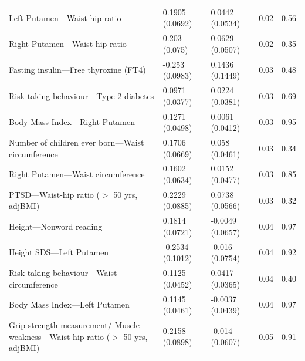\begin{table}[ht]
\begin{tabular}{lllrr}
  Left Putamen---Waist-hip ratio & 0.1905 (0.0692) & 0.0442 (0.0534) & 0.02 & 0.56 \\ 
  Right Putamen---Waist-hip ratio & 0.203 (0.075) & 0.0629 (0.0507) & 0.02 & 0.35 \\ 
  Fasting insulin---Free thyroxine (FT4) & -0.253 (0.0983) & 0.1436 (0.1449) & 0.03 & 0.48 \\ 
  Risk-taking behaviour---Type 2 diabetes & 0.0971 (0.0377) & 0.0224 (0.0381) & 0.03 & 0.69 \\ 
  Body Mass Index---Right Putamen & 0.1271 (0.0498) & 0.0061 (0.0412) & 0.03 & 0.95 \\ 
  Number of children ever born---Waist circumference & 0.1706 (0.0669) & 0.058 (0.0461) & 0.03 & 0.34 \\ 
  Right Putamen---Waist circumference & 0.1602 (0.0634) & 0.0152 (0.0477) & 0.03 & 0.85 \\ 
  PTSD---Waist-hip ratio ($>$ 50 yrs, adjBMI) & 0.2229 (0.0885) & 0.0738 (0.0566) & 0.03 & 0.32 \\ 
  Height---Nonword reading & 0.1814 (0.0721) & -0.0049 (0.0657) & 0.04 & 0.97 \\ 
  Height SDS---Left Putamen & -0.2534 (0.1012) & -0.016 (0.0754) & 0.04 & 0.92 \\ 
  Risk-taking behaviour---Waist circumference & 0.1125 (0.0452) & 0.0417 (0.0365) & 0.04 & 0.40 \\ 
  Body Mass Index---Left Putamen & 0.1145 (0.0461) & -0.0037 (0.0439) & 0.04 & 0.97 \\ 
  Grip strength measurement/ Muscle weakness---Waist-hip ratio ($>$ 50 yrs, adjBMI) & 0.2158 (0.0898) & -0.014 (0.0607) & 0.05 & 0.91 \\ 
   \hline
\end{tabular}
\end{table}


